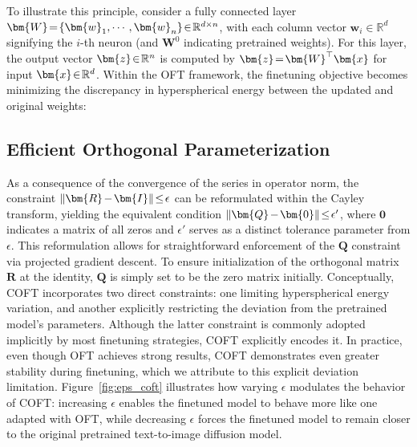 To illustrate this principle, consider a fully connected layer $\thickmuskip=2mu \medmuskip=2mu \bm{W}=\{\bm{w}_1,\cdots,\bm{w}_n\}\in\mathbb{R}^{d\times n}$, with each column vector $\bm{w}_i\in\mathbb{R}^{d}$ signifying the $i$-th neuron (and $\bm{W}^0$ indicating pretrained weights). For this layer, the output vector $\thickmuskip=2mu \medmuskip=2mu \bm{z}\in\mathbb{R}^n$ is computed by $\thickmuskip=2mu \medmuskip=2mu \bm{z}=\bm{W}^\top\bm{x}$ for input $\thickmuskip=2mu \medmuskip=2mu \bm{x}\in\mathbb{R}^d$. Within the OFT framework, the finetuning objective becomes minimizing the discrepancy in hyperspherical energy between the updated and original weights:

\subsection{Efficient Orthogonal Parameterization}\label{sect:eff_ortho}

As a consequence of the convergence of the series in operator norm, the constraint $\thickmuskip=2mu \medmuskip=2mu\|\bm{R}-\bm{I}\|\leq\epsilon$ can be reformulated within the Cayley transform, yielding the equivalent condition $\thickmuskip=2mu \medmuskip=2mu \|\bm{Q}-\bm{0}\|\leq\epsilon'$, where $\bm{0}$ indicates a matrix of all zeros and $\epsilon'$ serves as a distinct tolerance parameter from $\epsilon$. This reformulation allows for straightforward enforcement of the $\bm{Q}$ constraint via projected gradient descent. To ensure initialization of the orthogonal matrix $\bm{R}$ at the identity, $\bm{Q}$ is simply set to be the zero matrix initially. Conceptually, COFT incorporates two direct constraints: one limiting hyperspherical energy variation, and another explicitly restricting the deviation from the pretrained model’s parameters. Although the latter constraint is commonly adopted implicitly by most finetuning strategies, COFT explicitly encodes it. In practice, even though OFT achieves strong results, COFT demonstrates even greater stability during finetuning, which we attribute to this explicit deviation limitation. Figure~\ref{fig:eps_coft} illustrates how varying $\epsilon$ modulates the behavior of COFT: increasing $\epsilon$ enables the finetuned model to behave more like one adapted with OFT, while decreasing $\epsilon$ forces the finetuned model to remain closer to the original pretrained text-to-image diffusion model.

